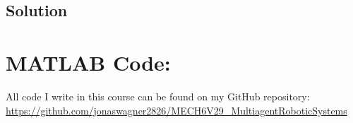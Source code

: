 \documentclass[]{article}
\numberwithin{equation}{section}
\begin{document}
\subsection*{Solution}










\newpage
\section{}
















\newpage
\appendix
\section{MATLAB Code:}\label{apx:matlab}
All code I write in this course can be found on my GitHub repository:\\
\href{https://github.com/jonaswagner2826/MECH6V29_MultiagentRoboticSystems}{https://github.com/jonaswagner2826/MECH6V29\_MultiagentRoboticSystems}

% 


% 
\end{document}
